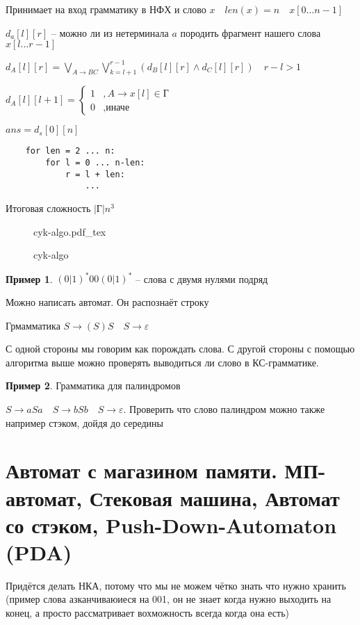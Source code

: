 \documentclass{book}
\theoremstyle{definition}
\newtheorem*{example}{Пример}
\newcommand{\incfig}[1]{%
    \def\svgwidth{\columnwidth}
    {#1.pdf_tex}
}
\begin{document}
Принимает на вход грамматику в НФХ и слово $x\quad len(x) = n\quad x[0\ldots n-1]$

$d_a[l][r]$ -- можно ли из нетерминала  $a$ породить фрагмент нашего слова  $x[l \ldots r-1]$

$d_A[l][r] = \bigvee\limits_{A\to BC} \bigvee\limits_{k = l+1}^{r-1} \left( d_B[l][r] \land d_C[l][r] \right)\quad r-l>1 $

$d_A[l][l+1] = \begin{cases}
    1&, A \to x[l]\in \text{Г}\\
    0&, \text{иначе}
\end{cases}$ 

$ans = d_s[0][n]$

 \begin{lstlisting}
    for len = 2 ... n:
        for l = 0 ... n-len:
            r = l + len:
                ...
\end{lstlisting}

Итоговая сложность $\left| \text{Г} \right| n^3$
\begin{figure}[!ht]
    \centering
    \incfig{cyk-algo}
    \caption{cyk-algo}
    \label{fig:cyk-algo}
\end{figure}

\begin{example}
    $(0|1)^*00(0|1)^*$ -- слова с двумя нулями подряд

    Можно написать автомат. Он распознаёт строку

    Грмамматика  $S \to (S)S\quad S\to \varepsilon$

    С одной стороны мы говорим как порождать слова. С другой стороны с помощью алгоритма выше можно проверять выводиться ли слово в КС-грамматике.
\end{example}

\begin{example}
    Грамматика для палиндромов

    $S\to aSa\quad S\to bSb\quad S\to \varepsilon$. Проверить что слово палиндром можно также например стэком, дойдя до середины
\end{example}

\section{Автомат с магазином памяти. МП-автомат, Стековая машина, Автомат со стэком, Push-Down-Automaton (PDA)}
    Придётся делать НКА, потому что мы не можем чётко знать что нужно хранить (пример слова азканчиваюиеся на 001, он не знает когда нужно выходить на конец, а просто рассматривает вохможность всегда когда она есть)
\end{document}

